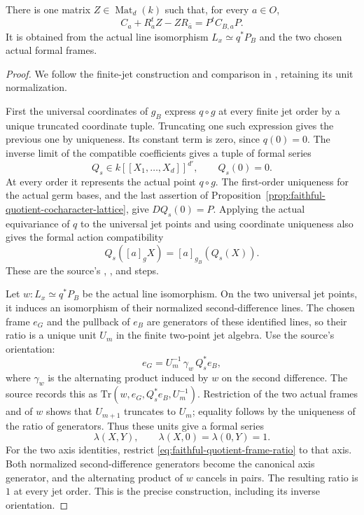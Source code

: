 \begin{srproposition}
\label{prop:faithful-quotient-mixed-gauge}
There is one matrix \(Z\in\operatorname{Mat}_d(k)\) such that,
for every \(a\in O\),
\[
          C_a+R_a^t Z-ZR_{\bar a}=P^t C_{B,a}P .
 \tag{QL5}\label{eq:faithful-quotient-mixed-gauge}
\]
It is obtained from the actual line isomorphism
\(L_x\simeq q^*P_B\) and the two chosen actual formal frames.
\end{srproposition}
\begin{proof}
We follow the finite-jet construction and comparison in
, retaining its unit normalization.

First the universal coordinates of \(g_B\) express
\(q\circ g\) at every finite jet order by a unique truncated
coordinate tuple.  Truncating one such expression gives the
previous one by uniqueness.  Its constant term is zero,
since \(q(0)=0\).
The inverse limit of the compatible coefficients gives
a tuple of formal series
\[
                     Q_s\in k[[X_1,\ldots,X_d]]^{d'},
                      \qquad Q_s(0)=0 .
\]
At every order it represents the actual point \(q\circ g\).
The first-order uniqueness for the actual germ bases, and
the last assertion of
Proposition~\ref{prop:faithful-quotient-cocharacter-lattice},
give \(D Q_s(0)=P\).
Applying the actual equivariance of \(q\) to the universal
jet points and using coordinate uniqueness also gives the
formal action compatibility
\[
             Q_s([a]_gX)=[a]_{g_B}(Q_s(X)).
 \tag{QL6}\label{eq:faithful-quotient-formal-action}
\]
These are the source's
,
, and
 steps.

Let \(w:L_x\simeq q^*P_B\) be the actual line isomorphism.
On the two universal jet points, it induces an isomorphism
of their normalized second-difference lines.
The chosen frame \(e_G\) and the pullback of \(e_B\) are
generators of these identified lines, so their ratio is a
unique unit \(U_m\) in the finite two-point jet algebra.
Use the source's orientation:
\[
               e_G=U_m^{-1}\,\gamma_w\,Q_s^*e_B ,
 \tag{QL7}\label{eq:faithful-quotient-frame-ratio}
\]
where \(\gamma_w\) is the alternating product induced by
\(w\) on the second difference.
The source records this as
\(\mathrm{Tr}(w,e_G,Q_s^*e_B,U_m^{-1})\).
Restriction of the two actual frames and of \(w\) shows
that \(U_{m+1}\) truncates to \(U_m\); equality follows
by the uniqueness of the ratio of generators.
Thus these units give a formal series
\[
                   \lambda(X,Y),\qquad
                   \lambda(X,0)=\lambda(0,Y)=1 .
\]
For the two axis identities, restrict
\eqref{eq:faithful-quotient-frame-ratio} to that axis.
Both normalized second-difference generators become the
canonical axis generator, and the alternating product of
\(w\) cancels in pairs.  The resulting ratio is \(1\)
at every jet order.  This is the precise
construction, including its inverse orientation.


\end{proof}
